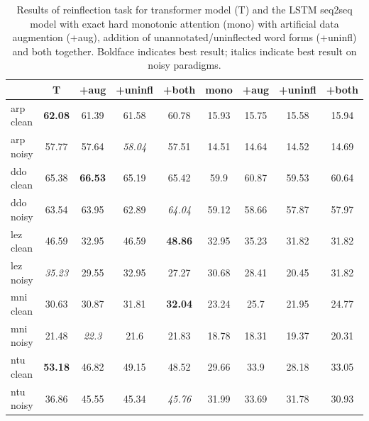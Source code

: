\documentclass[12pt]{article}
\begin{document}
\begin{table}[t]
    \label{tab:IGT2P}
    \centering
    \setlength{\tabcolsep}{8.pt}
    \begin{tabular}{l|cccc|cccc}
    \toprule
      \textbf{} & \textbf{T} & \textbf{+aug} & \textbf{+uninfl} & \textbf{+both} & \textbf{mono} &  \textbf{+aug} &
      \textbf{+uninfl} &
      \textbf{+both} \\ 
       \midrule
      arp clean & \textbf{62.08} & 61.39 & 61.58 & 60.78 & 15.93 & 15.75 & 15.58 & 15.94 \\
      arp noisy & 57.77 & 57.64 & \textit{58.04} & 57.51 & 14.51 & 14.64 & 14.52 & 14.69 \\
      \midrule
      ddo clean & 65.38 & \textbf{66.53} & 65.19 & 65.42 & 59.9 & 60.87 & 59.53 & 60.64  \\
      ddo noisy & 63.54 & 63.95 & 62.89 & \textit{64.04} & 59.12 & 58.66 & 57.87 & 57.97 \\
      \midrule
      lez clean & 46.59 & 32.95 & 46.59 & \textbf{48.86} & 32.95 & 35.23 & 31.82 & 31.82 \\
      lez noisy & \textit{35.23} & 29.55 & 32.95 & 27.27 & 30.68 & 28.41 & 20.45 & 31.82 \\
      \midrule
      mni clean & 30.63 & 30.87 & 31.81 & \textbf{32.04} & 23.24 & 25.7 & 21.95 & 24.77 \\
      mni noisy & 21.48 & \textit{22.3} & 21.6 & 21.83 & 18.78 & 18.31 & 19.37 & 20.31 \\
      \midrule
      ntu clean & \textbf{53.18} & 46.82 & 49.15 & 48.52 & 29.66 & 33.9 & 28.18 & 33.05 \\
      ntu noisy & 36.86 & 45.55 & 45.34 & \textit{45.76} & 31.99 & 33.69 & 31.78 & 30.93 \\
      \bottomrule
    \end{tabular}
    \caption{Results of reinflection task for transformer model (T) and the LSTM seq2seq model with exact hard monotonic attention (mono) with artificial data augmention (+aug), addition of unannotated/uninflected word forms (+uninfl) and both together. Boldface indicates best result; italics indicate best result on noisy paradigms.}
\end{table}


\end{document}
